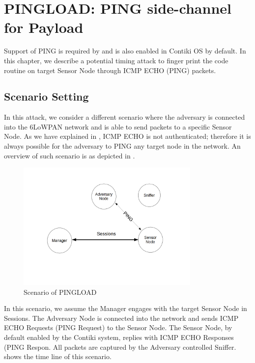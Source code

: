 \chapter{PINGLOAD: PING side-channel for Payload } \label{Chp: PINGLOAD}

Support of PING is required by \cite{rfc1122} and is also enabled in Contiki OS by default. In this chapter, we describe a potential timing attack to finger print the code routine on target Sensor Node through ICMP ECHO (PING) packets.

\section{Scenario Setting}

In this attack, we consider a different scenario where the adversary is connected into the 6LoWPAN network and is able to send packets to a specific Sensor Node. As we have explained in , ICMP ECHO is not authenticated; therefore it is always possible for the adversary to PING any target node in the network. An overview of such scenario is as depicted in .

\begin{figure}[h!]
	\center
	\includegraphics[width=0.8\textwidth]{fig/PINGLOAD_scenario.png}
	\caption{Scenario of PINGLOAD}
	\label{Fig: Scenario of PINGLOAD}
\end{figure}

In this scenario, we assume the Manager engages with the target Sensor Node in Sessions. The Adversary Node is connected into the network and sends ICMP ECHO Requests (PING Request) to the Sensor Node. The Sensor Node, by default enabled by the Contiki system, replies with ICMP ECHO Responses (PING Respon. All packets are captured by the Adversary controlled Sniffer.  shows the time line of this scenario.

